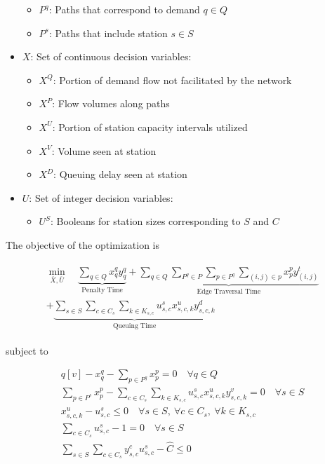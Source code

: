 \begin{itemize}
\begin{itemize}
		\item $P^q$: Paths that correspond to demand $q \in Q$
		\item $P^s$: Paths that include station $s \in S$
	\end{itemize}
	\item $X$: Set of continuous decision variables: \begin{itemize}
		\item $X^Q$: Portion of demand flow not facilitated by the network
		\item $X^P$: Flow volumes along paths
		\item $X^U$: Portion of station capacity intervals utilized
		\item $X^V$: Volume seen at station
		\item $X^D$: Queuing delay seen at station
	\end{itemize}
	\item $U$: Set of integer decision variables: \begin{itemize}
		\item $U^S$: Booleans for station sizes corresponding to $S$ and $C$
	\end{itemize}
\end{itemize}


The objective of the optimization is

\begin{gather}
	\begin{gathered}
	\min_{\overline{X},\overline{U}}\quad \underbrace{\sum_{q \in Q} x^q_qy^q_q}_{\text{Penalty Time}} + \underbrace{\sum_{q \in Q}\sum_{P^q \in P}\sum_{p \in P^q}\sum_{(i, j) \in p} x^p_py^t_{(i, j)}}_{\text{Edge Traversal Time}} \\+ \underbrace{\sum_{s \in S}\sum_{c \in C_s}
		\sum_{k \in K_{s, c}} u^s_{s, c}x^u_{s, c, k}y^d_{s, c, k}}_{\text{Queuing Time}} \label{eq:tm:obj}
	\end{gathered}
\end{gather}

subject to

\begin{gather}
	q[v] - x^q_q - \sum_{p \in P^q}x^p_p = 0 \quad \forall q \in Q \label{eq:tm:flow_dem} \\
	\sum_{p \in P^s} x^p_p - \sum_{c \in C_s}
	\sum_{k \in K_{s, c}} u^s_{s, c}x^u_{s, c, k}y^v_{s, c, k} = 0 \quad \forall s \in S \label{eq:tm:flow_cons} \\
	x^u_{s, c, k} - u^s_{s, c} \leq 0 \quad \forall s \in S, \ \forall c \in C_s,\ \forall k\in K_{s, c} \label{eq:tm:sz_int} \\
	\sum_{c \in C_s} u^s_{s, c} - 1 = 0 \quad \forall s \in S \label{eq:tm:chg_unity} \\
	\sum_{s \in S}\sum_{c \in C_s} y^c_{s, c}u^s_{s, c} - \hat{C} \leq 0 \label{eq:tm:chg_tot}
\end{gather}

